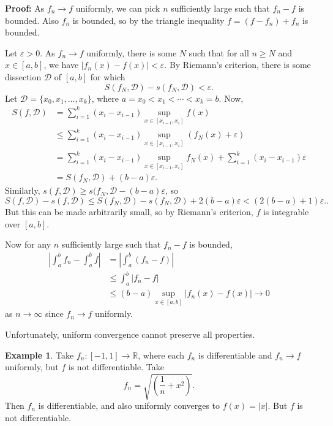 \documentclass[12pt]{article}
\theoremstyle{definition}
\newtheorem{example}{Example}[section]
\theoremstyle{remark}
\begin{document}
\begin{adjustbox}{minipage = \columnwidth - 25.5pt, margin=1em, frame=1pt, margin=0em}
	\textbf{Proof:} As $f_n \to f$ uniformly, we can pick $n$ sufficiently large such that $f_n - f$ is bounded. Also $f_n$ is bounded, so by the triangle inequality $f = (f - f_n) + f_n$ is bounded.

	Let $\varepsilon > 0$. As $f_n \to f$ uniformly, there is some $N$ such that for all $n \geq N$ and $x \in [a, b]$, we have $|f_n(x) - f(x)| < \varepsilon$. By Riemann's criterion, there is some dissection $\mathcal{D}$ of $[a, b]$ for which
	\[
		S(f_N, \mathcal{D}) - s(f_N, \mathcal{D}) < \varepsilon
	.\]
	Let $\mathcal{D} = \{x_0, x_1, \ldots, x_k\}$, where $a = x_0 < x_1 < \cdots < x_k = b$. Now,
	\begin{align*}
		S(f, \mathcal{D}) &= \sum_{i = 1}^{k}(x_{i} - x_{i-1}) \sup_{x \in [x_{i-1}, x_{i}]} f(x) \\
				  &\leq \sum_{i = 1}^{k}(x_{i} - x_{i-1}) \sup_{x \in [x_{i-1}, x_i]} (f_N(x) + \varepsilon) \\
				  &= \sum_{i = 1}^{k}(x_{i} - x_{i-1})\sup_{x \in [x_{i-1}, x_i]}f_N(x) + \sum_{i = 1}^{k}(x_{i} - x_{i-1}) \varepsilon \\
				  &= S(f_N, \mathcal{D}) + (b - a) \varepsilon.
	\end{align*}
	Similarly, $s(f, \mathcal{D}) \geq s(f_N, \mathcal{D} - (b - a) \varepsilon$, so
	\[
		S(f, \mathcal{D}) - s(f, \mathcal{D}) \leq S(f_N, \mathcal{D}) - s(f_N, \mathcal{D}) + 2(b - a)\varepsilon < (2(b - a) + 1)\varepsilon.
	.\]
	But this can be made arbitrarily small, so by Riemann's criterion, $f$ is integrable over $[a, b]$.

	Now for any $n$ sufficiently large such that $f_n - f$ is bounded,
	\begin{align*}
		\left| \int_{a}^{b} f_n - \int_{a}^{b}f \right| &= \left| \int_{a}^{b} (f_n - f) \right| \\
								&\leq \int_{a}^{b} |f_n - f| \\
								&\leq (b - a) \sup_{x \in [a, b]}|f_n(x) - f(x)| \to 0
	\end{align*}
	as $n \to \infty$ since $f_n \to f$ uniformly.
\end{adjustbox}

Unfortunately, uniform convergence cannot preserve all properties.

\begin{adjustbox}{minipage = \columnwidth - 25.5pt, margin=1em, frame=1pt, margin=0em}
\begin{example}
	Take $f_n : [-1, 1] \to \mathbb{R}$, where each $f_n$ is differentiable and $f_n \to f$ uniformly, but $f$ is not differentiable. Take
	\[
		f_n = \sqrt{\left( \frac{1}{n} + x^2 \right)}
	.\]
	Then $f_n$ is differentiable, and also uniformly converges to $f(x) = |x|$. But $f$ is not differentiable.
\end{example}

\end{adjustbox}
\end{document}
